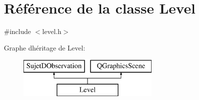 \hypertarget{class_level}{}\section{Référence de la classe Level}
\label{class_level}


{\ttfamily \#include $<$level.\+h$>$}

Graphe d\textquotesingle{}héritage de Level\+:\begin{figure}[H]
\begin{center}
\leavevmode
\includegraphics[height=2.000000cm]{class_level}
\end{center}
\end{figure}
